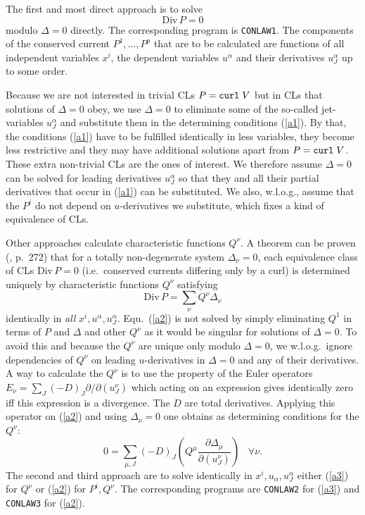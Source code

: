 The first and most direct approach is to solve 
\begin{equation} 
\mbox{Div}\,P = 0                                     \label{a1} 
\end{equation}
modulo $\Delta = 0$ directly. The corresponding program is
{\tt CONLAW1}.
The components of the conserved current $P^1,\ldots,P^p$ that are 
to be calculated
are functions of all independent variables $x^i$, the dependent variables
$u^{\alpha}$ and their derivatives $u^{\alpha}_{J}$ up to some order.

Because we are not interested in trivial CLs $P = {\tt curl}\; V$
but in CLs that solutions of $\Delta = 0$ obey,
we use $\Delta = 0$ to eliminate some 
of the so-called jet-variables
$u^{\alpha}_{J}$ and substitute them
in the determining conditions (\ref{a1}). 
By that, the conditions (\ref{a1}) have to be fulfilled identically
in less variables, they become 
less restrictive and they may have additional solutions apart from 
$P = {\tt curl}\; V$. These extra non-trivial CLs are the
ones of interest.
We therefore assume $\Delta = 0$ can be solved for 
leading derivatives $u^{\alpha}_{J}$ so that they and 
all their partial derivatives that occur in (\ref{a1}) can be substituted.
We also, w.l.o.g., assume that the $P^i$ do not depend on 
$u$-derivatives we substitute, which fixes a kind of
equivalence of CLs.

Other approaches calculate characteristic functions $Q^{\nu}$.
A theorem can be proven (\cite{PO}, p.\ 272) that for a totally
non-degenerate system $\Delta_{\nu}=0$, 
each equivalence class of CLs
$\mbox{Div}\,P = 0$ (i.e.\ conserved currents differing only by a curl)
is determined uniquely by characteristic functions
$Q^{\nu}$ satisfying
\begin{equation}
\mbox{Div}\,P = \sum_{\nu} Q^{\nu} \Delta_{\nu}  \label{a2}
\end{equation}
identically in {\it all} $x^i,u^{\alpha},u^{\alpha}_{J}$.
Equ.\ (\ref{a2}) is not solved by simply eliminating $Q^1$ in terms
of $P$ and $\Delta$ and other $Q^{\nu}$ as it would be singular for
solutions of $\Delta=0$. To avoid this and because the $Q^{\nu}$ are 
unique only modulo $\Delta=0$,
we w.l.o.g.\ ignore dependencies of $Q^\nu$ on
leading $u$-derivatives in $\Delta=0$ and any of their derivatives.
A way to calculate the $Q^{\nu}$ is to use the property of the
Euler operators $E_{\nu} = \sum_J (-D)_J \partial/\partial(u^{\nu}_{J})$ 
which acting
on an expression gives identically zero iff this expression is a divergence.
The $D$ are total derivatives.
Applying this operator on (\ref{a2}) and using $\Delta_{\nu}=0$ one
obtains as determining conditions for the $Q^{\nu}$:
\begin{equation}
0 = \sum_{\mu,J} (-D)_J
   \left( Q^{\mu} \frac{\partial \Delta_{\mu}}
                       {\partial(u^{\nu}_{J})}
   \right) \;\;\; \forall \nu.                           \label{a3}
\end{equation}
The second and third approach are to solve identically in
$x^i,u_{\alpha},u^{\alpha}_{J}$ either 
(\ref{a3}) for $Q^{\nu}$ or (\ref{a2}) for $P^i, Q^{\nu}$.
The corresponding programs are
{\tt CONLAW2} for (\ref{a3}) and {\tt CONLAW3} for (\ref{a2}).

